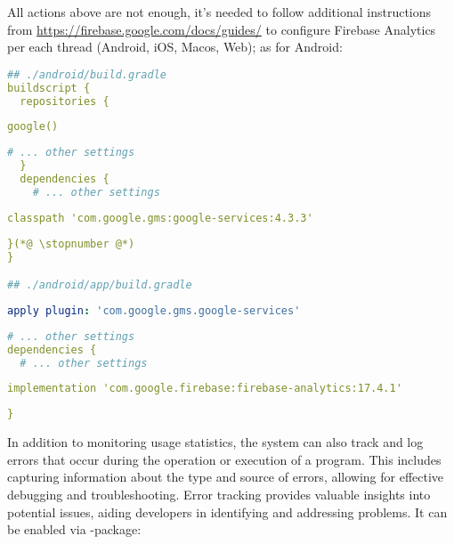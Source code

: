 \noindent All actions above are not enough, it's needed to follow additional instructions from  
\href{https://firebase.google.com/docs/guides/}{https://firebase.google.com/docs/guides/} to configure
Firebase Analytics per each thread (Android, iOS, Macos, Web); as for Android:

\begin{lstlisting}[language=yaml]
## ./android/build.gradle
buildscript {
  repositories {
\end{lstlisting}
{
\xpretocmd{\lstlisting}{\vspace{-12pt}}{}{}
\begin{lstlisting}[firstnumber=4, language=yaml, backgroundcolor=\color{backgreen}]
      google()
\end{lstlisting}
\begin{lstlisting}[firstnumber=5, language=yaml]
      # ... other settings
  }
  dependencies {
    # ... other settings
\end{lstlisting}
\begin{lstlisting}[firstnumber=9, language=yaml, backgroundcolor=\color{backgreen}]
    classpath 'com.google.gms:google-services:4.3.3'
\end{lstlisting}
\begin{lstlisting}[firstnumber=10, language=yaml]
  }(*@ \stopnumber @*)
}

## ./android/app/build.gradle
\end{lstlisting}
\begin{lstlisting}[firstnumber=2, language=yaml, backgroundcolor=\color{backgreen}]
apply plugin: 'com.google.gms.google-services'
\end{lstlisting}
\begin{lstlisting}[firstnumber=3, language=yaml]
# ... other settings
dependencies {
  # ... other settings
\end{lstlisting}
\begin{lstlisting}[firstnumber=6, language=yaml, backgroundcolor=\color{backgreen}]
  implementation 'com.google.firebase:firebase-analytics:17.4.1'
\end{lstlisting}
\begin{lstlisting}[firstnumber=7, language=yaml]
}
\end{lstlisting}
}

\noindent In addition to monitoring usage statistics, the system can also track and log errors that occur during the 
operation or execution of a program. This includes capturing information about the type and source of errors, 
allowing for effective debugging and troubleshooting. Error tracking provides valuable insights into potential issues, 
aiding developers in identifying and addressing problems. It can be enabled via -package:

